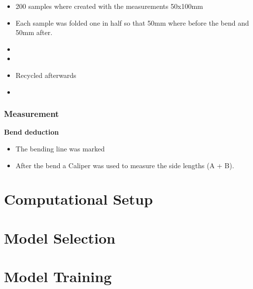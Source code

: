 \begin{itemize}
    \item 200 samples where created with the measurements 50x100mm
    \item Each sample was folded one in half so that 50mm where before the bend and 50mm after.
    \item 
    \item 
    \item Recycled afterwards
    \item 
\end{itemize}
\subsubsection{Measurement}

\textbf{Bend deduction} 
\begin{itemize}
    \item The bending line was marked 
    \item After the bend a Caliper was used to measure the side lengths (A + B).
\end{itemize}

\section{Computational Setup}

\section{Model Selection}

\section{Model Training}








